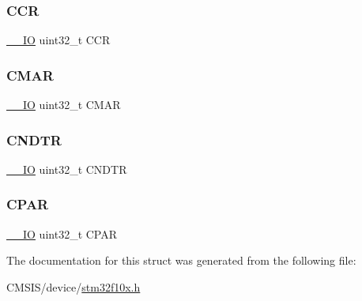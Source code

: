 \subsubsection{\texorpdfstring{CCR}{CCR}}
{\footnotesize\ttfamily \mbox{\hyperlink{core__sc300_8h_aec43007d9998a0a0e01faede4133d6be}{\+\_\+\+\_\+\+IO}} uint32\+\_\+t C\+CR}

\mbox{\label{struct_d_m_a___channel___type_def_ab51edd49cb9294ebe2db18fb5cf399dd}} 
\subsubsection{\texorpdfstring{CMAR}{CMAR}}
{\footnotesize\ttfamily \mbox{\hyperlink{core__sc300_8h_aec43007d9998a0a0e01faede4133d6be}{\+\_\+\+\_\+\+IO}} uint32\+\_\+t C\+M\+AR}

\mbox{\label{struct_d_m_a___channel___type_def_aae019365e4288337da20775971c1a123}} 
\subsubsection{\texorpdfstring{CNDTR}{CNDTR}}
{\footnotesize\ttfamily \mbox{\hyperlink{core__sc300_8h_aec43007d9998a0a0e01faede4133d6be}{\+\_\+\+\_\+\+IO}} uint32\+\_\+t C\+N\+D\+TR}

\mbox{\label{struct_d_m_a___channel___type_def_a07aacf332c9bf310ff5be02140f892e1}} 
\subsubsection{\texorpdfstring{CPAR}{CPAR}}
{\footnotesize\ttfamily \mbox{\hyperlink{core__sc300_8h_aec43007d9998a0a0e01faede4133d6be}{\+\_\+\+\_\+\+IO}} uint32\+\_\+t C\+P\+AR}



The documentation for this struct was generated from the following file\+:\begin{DoxyCompactItemize}
\item 
C\+M\+S\+I\+S/device/\mbox{\hyperlink{stm32f10x_8h}{stm32f10x.\+h}}\end{DoxyCompactItemize}
